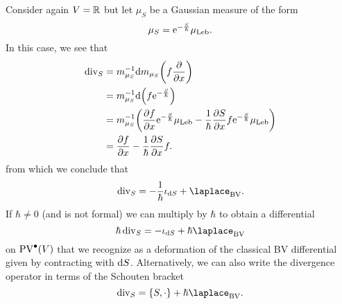 \begin{example}
  Consider again $V = \mathbb{R}$ but let $\mu_S$ be a Gaussian measure of the form
  \begin{equation*}
    \mu_S = \mathrm{e}^{-\frac{S}{\hbar}} \mu_\text{Leb}.
  \end{equation*}
  In this case, we see that
  \begin{align*}
    \operatorname{div}_S 
    &= m_{\mu_S}^{-1} \mathrm{d} m_{\mu_S} \biggl( f \frac{\partial}{\partial x} \biggr) \\
    &= m_{\mu_S}^{-1} \mathrm{d} \Bigl( f \mathrm{e}^{-\frac{S}{\hbar}} \Bigr) \\
    &= m_{\mu_S}^{-1} \biggl( \frac{\partial f}{\partial  x} \mathrm{e}^{-\frac{S}{\hbar}} \mu_\text{Leb}
    - \frac{1}{\hbar} \frac{\partial S}{\partial x} f \mathrm{e}^{-\frac{S}{\hbar}} \mu_\text{Leb} \biggr) \\
    &= \frac{\partial f}{\partial  x} - \frac{1}{\hbar} \frac{\partial S}{\partial  x} f.
  \end{align*}
  from which we conclude that
  \begin{equation*}
    \divergence_S = - \frac{1}{\hbar} \iota_{\drm S} + \bv.
  \end{equation*}
  If $\hbar \neq 0$ (and is not formal) we can multiply by $\hbar$ to obtain a differential
\begin{equation*}
    \hbar \divergence_S = - \iota_{\drm S} + \hbar \bv
  \end{equation*}
  on $\operatorname{PV}^{\bullet}(V)$ that we recognize as a deformation of the classical BV differential given by contracting with $\mathrm{d} S$. Alternatively, we can also write the divergence operator in terms of the Schouten bracket
  \begin{equation*}
    \divergence_S = \{ S, \cdot \} + \hbar \bv.
  \end{equation*}
\end{example}

